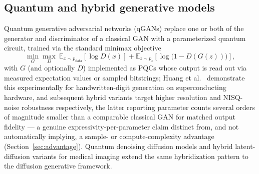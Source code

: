 \documentclass[11pt]{article}
\begin{document}
\subsection{Quantum and hybrid generative models}
Quantum generative adversarial networks (qGANs) \cite{Zoufal2019} replace one or both of the generator and discriminator of a classical GAN with a parameterized quantum circuit, trained via the standard minimax objective
\begin{equation}
\min_{G} \max_{D}\ \mathbb{E}_{x\sim p_{\text{data}}}\left[\log D(x)\right] + \mathbb{E}_{z\sim p_z}\left[\log\bigl(1-D(G(z))\bigr)\right],
\end{equation}
with $G$ (and optionally $D$) implemented as PQCs whose output is read out via measured expectation values or sampled bitstrings; Huang et al.\ \cite{HuangExpGAN2020} demonstrate this experimentally for handwritten-digit generation on superconducting hardware, and subsequent hybrid variants \cite{HybridGANHighRes2022,MosaiQ2023} target higher resolution and NISQ-noise robustness respectively, the latter reporting parameter counts several orders of magnitude smaller than a comparable classical GAN for matched output fidelity — a genuine expressivity-per-parameter claim distinct from, and not automatically implying, a sample- or compute-complexity advantage (Section~\ref{sec:advantage}). Quantum denoising diffusion models \cite{QuantumDiffusion2024} and hybrid latent-diffusion variants for medical imaging \cite{HybridLatentDiffusion2025} extend the same hybridization pattern to the diffusion generative framework.
\end{document}
